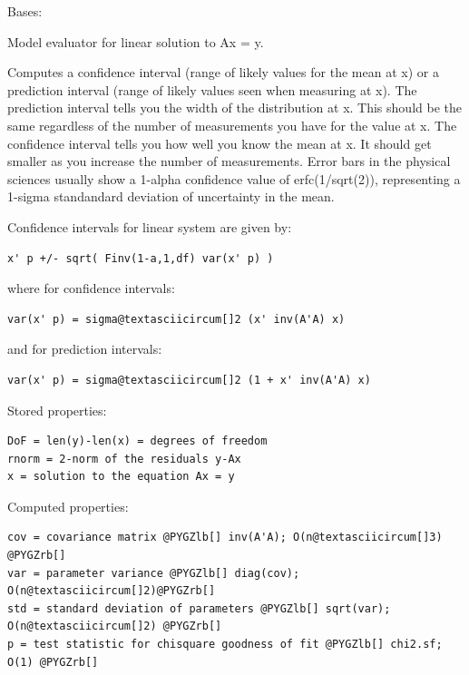 \documentclass[letterpaper,10pt,english]{sphinxmanual}
\begin{document}
\begin{fulllineitems}
\label{api/wsolve:refl1d.wsolve.LinearModel}
Bases: 

Model evaluator for linear solution to Ax = y.

Computes a confidence interval (range of likely values for the
mean at x) or a prediction interval (range of likely values
seen when measuring at x).  The prediction interval tells
you the width of the distribution at x.  This should be the same
regardless of the number of measurements you have for the value
at x.  The confidence interval tells you how well you know the
mean at x.  It should get smaller as you increase the number of
measurements.  Error bars in the physical sciences usually show
a 1-alpha confidence value of erfc(1/sqrt(2)), representing
a 1-sigma standandard deviation of uncertainty in the mean.

Confidence intervals for linear system are given by:

\begin{Verbatim}[commandchars=@\[\]]
x' p +/- sqrt( Finv(1-a,1,df) var(x' p) )
\end{Verbatim}

where for confidence intervals:

\begin{Verbatim}[commandchars=@\[\]]
var(x' p) = sigma@textasciicircum[]2 (x' inv(A'A) x)
\end{Verbatim}

and for prediction intervals:

\begin{Verbatim}[commandchars=@\[\]]
var(x' p) = sigma@textasciicircum[]2 (1 + x' inv(A'A) x)
\end{Verbatim}

Stored properties:

\begin{Verbatim}[commandchars=@\[\]]
DoF = len(y)-len(x) = degrees of freedom
rnorm = 2-norm of the residuals y-Ax
x = solution to the equation Ax = y
\end{Verbatim}

Computed properties:

\begin{Verbatim}[commandchars=@\[\]]
cov = covariance matrix @PYGZlb[] inv(A'A); O(n@textasciicircum[]3) @PYGZrb[]
var = parameter variance @PYGZlb[] diag(cov); O(n@textasciicircum[]2)@PYGZrb[]
std = standard deviation of parameters @PYGZlb[] sqrt(var); O(n@textasciicircum[]2) @PYGZrb[]
p = test statistic for chisquare goodness of fit @PYGZlb[] chi2.sf; O(1) @PYGZrb[]
\end{Verbatim}


\end{fulllineitems}
\end{document}
